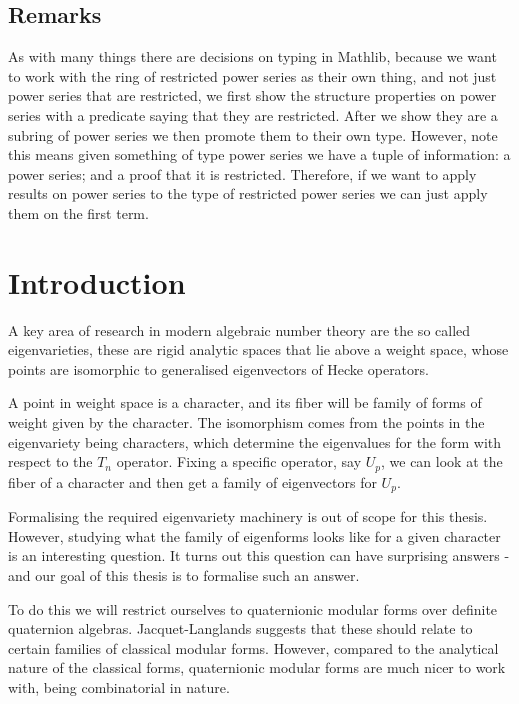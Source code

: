 \section{Remarks}

As with many things there are decisions on typing in Mathlib, because we want to work with the ring
of restricted power series as their own thing, and not just power series that are restricted, we
first show the structure properties on power series with a predicate saying that they are restricted.
After we show they are a subring of power series we then promote them to their own type. However,
note this means given something of type power series we have a tuple of information: a power series;
and a proof that it is restricted. Therefore, if we want to apply results on power series to the
type of restricted power series we can just apply them on the first term.


\chapter{Introduction}


A key area of research in modern algebraic number theory are the so called eigenvarieties, these
are rigid analytic spaces that lie above a weight space, whose points are isomorphic to
generalised eigenvectors of Hecke operators.

A point in weight space is a character, and its fiber will be family of forms of weight given by the
character. The isomorphism comes from the points in the eigenvariety being characters, which
determine the eigenvalues for the form with respect to the $T_n$ operator. Fixing a specific operator,
say $U_p$, we can look at the fiber of a character and then get a family of eigenvectors for $U_p$.

Formalising the required eigenvariety machinery is out of scope for this thesis. However, studying
what the family of eigenforms looks like for a given character is an interesting question. It turns
out this question can have surprising answers - and our goal of this thesis is to formalise
such an answer.

To do this we will restrict ourselves to quaternionic modular forms over definite quaternion algebras.
Jacquet-Langlands suggests that these should relate to certain families of classical modular forms.
However, compared to the analytical nature of the classical forms, quaternionic modular forms are
much nicer to work with, being combinatorial in nature.

